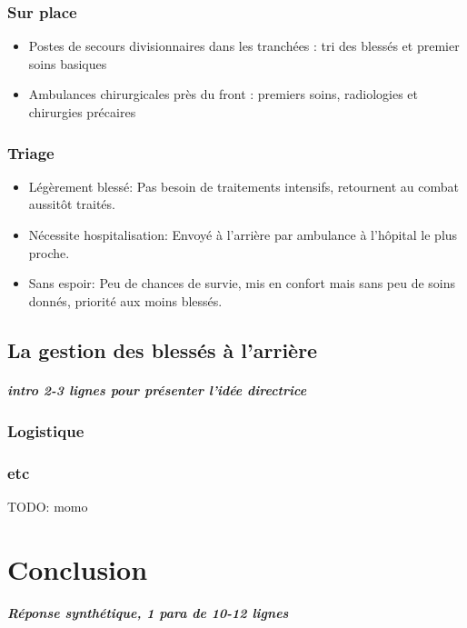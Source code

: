 \documentclass[a4paper, BCOR=0mm, fontsize=12pt, titlepage=firstiscover]{scrreprt}
\begin{document}
		\subsection{Sur place}
			\begin{itemize}
				\item Postes de secours divisionnaires dans les tranchées : tri des blessés et premier soins basiques
				\item Ambulances chirurgicales près du front : premiers soins, radiologies et chirurgies précaires
			\end{itemize}
		\subsection{Triage}
			\begin{itemize}
				\item Légèrement blessé: Pas besoin de traitements intensifs, retournent au combat aussitôt traités.
				\item Nécessite hospitalisation: Envoyé à l'arrière par ambulance à l'hôpital le plus proche.
				\item Sans espoir: Peu de chances de survie, mis en confort mais sans peu de soins donnés, priorité aux moins blessés. \cite{triage}
			\end{itemize}
	\newpage
	\section{La gestion des blessés à l'arrière}
		\paragraph{intro 2-3 lignes pour présenter l'idée directrice}
		\subsection{Logistique}
		\subsection{etc}
		TODO: momo
	\chapter{Conclusion}
		\paragraph{Réponse synthétique, 1 para de 10-12 lignes}
		
\end{document}
